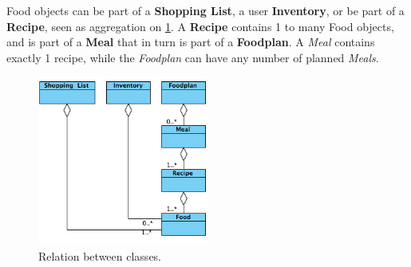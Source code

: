 Food objects can be part of a \textbf{Shopping List}, a user \textbf{Inventory}, or be part of a \textbf{Recipe}, seen as aggregation on \cref{fig:classDiagram}. A \textbf{Recipe} contains 1 to many Food objects, and is part of a \textbf{Meal} that in turn is part of a \textbf{Foodplan}. A \textit{Meal} contains exactly 1 recipe, while the \textit{Foodplan} can have any number of planned \textit{Meals}.

\begin{figure}[H]
	\centering
	\includegraphics[width=0.50\textwidth]{Grafik/FoodPlanner/FoodPlannerClassDiagram.png}
	\caption{Relation between classes.}
	\label{fig:classDiagram}
\end{figure}